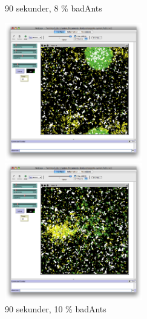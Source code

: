 \documentclass[titlepage, a4paper, 12pt]{article}
\begin{document}
\begin{figure}
  \begin{minipage}[b]{0.5\linewidth} %
    \centering
    \caption{90 sekunder, 8 \% badAnts}
    \includegraphics[width=6cm]{images/40-bad-90.png}
  \end{minipage}
  \hspace{0.5cm} %
  \begin{minipage}[b]{0.5\linewidth}
    \centering
    \caption{90 sekunder, 10 \% badAnts}\label{fig:last-conv-pic}
    \includegraphics[width=6cm]{images/50-bad-90.png}
  \end{minipage}
\end{figure}
\end{document}
